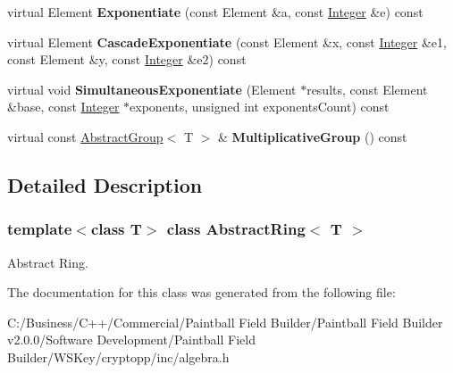 \begin{DoxyCompactItemize}
\item 
\hypertarget{class_abstract_ring_a414c365838b0475825456ecdcf5f7c11}{
virtual Element {\bfseries Exponentiate} (const Element \&a, const \hyperlink{class_integer}{Integer} \&e) const }
\label{class_abstract_ring_a414c365838b0475825456ecdcf5f7c11}

\item 
\hypertarget{class_abstract_ring_a94539e1d5dd42444897b271757aef5ae}{
virtual Element {\bfseries CascadeExponentiate} (const Element \&x, const \hyperlink{class_integer}{Integer} \&e1, const Element \&y, const \hyperlink{class_integer}{Integer} \&e2) const }
\label{class_abstract_ring_a94539e1d5dd42444897b271757aef5ae}

\item 
\hypertarget{class_abstract_ring_aba8e0e0f2c3a2143cf8f1e2f2775a1bf}{
virtual void {\bfseries SimultaneousExponentiate} (Element $\ast$results, const Element \&base, const \hyperlink{class_integer}{Integer} $\ast$exponents, unsigned int exponentsCount) const }
\label{class_abstract_ring_aba8e0e0f2c3a2143cf8f1e2f2775a1bf}

\item 
\hypertarget{class_abstract_ring_ab48b7bf4c39d1b2bd06ac92e71e0b905}{
virtual const \hyperlink{class_abstract_group}{AbstractGroup}$<$ T $>$ \& {\bfseries MultiplicativeGroup} () const }
\label{class_abstract_ring_ab48b7bf4c39d1b2bd06ac92e71e0b905}

\end{DoxyCompactItemize}


\subsection{Detailed Description}
\subsubsection*{template$<$class T$>$ class AbstractRing$<$ T $>$}

Abstract Ring. 

The documentation for this class was generated from the following file:\begin{DoxyCompactItemize}
\item 
C:/Business/C++/Commercial/Paintball Field Builder/Paintball Field Builder v2.0.0/Software Development/Paintball Field Builder/WSKey/cryptopp/inc/algebra.h\end{DoxyCompactItemize}

